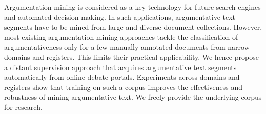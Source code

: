 Argumentation mining is considered as a key technology for future search engines and automated decision making. In such applications, argumentative text segments have to be mined from large and diverse document collections. However, most existing argumentation mining approaches tackle the classification of argumentativeness only for a few manually annotated documents from narrow domains and registers. This limits their practical applicability. We hence propose a distant supervision approach that acquires argumentative text segments automatically from online debate portals. Experiments across domains and registers show that training on such a corpus improves the effectiveness and robustness of mining argumentative text. We freely provide the underlying corpus for research.
